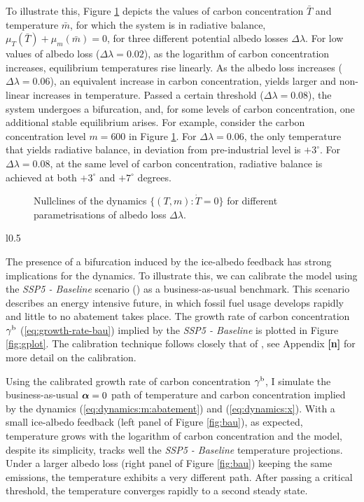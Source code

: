 \documentclass[../../main.tex]{subfiles}
\begin{document}
To illustrate this, Figure \ref{fig:nullclines} depicts the values of carbon concentration $\bar{T}$ and temperature $\bar m$, for which the system is in radiative balance, $\mu_T(\bar{T}) + \mu_m(\bar{m}) = 0$, for three different potential albedo losses $\Delta \lambda$. For low values of albedo loss ($\Delta \lambda = 0.02$), as the logarithm of carbon concentration increases, equilibrium temperatures rise linearly. As the albedo loss increases ($\Delta \lambda = 0.06$), an equivalent increase in carbon concentration, yields larger and non-linear increases in temperature. Passed a certain threshold ($\Delta \lambda = 0.08$), the system undergoes a bifurcation, and, for some levels of carbon concentration, one additional stable equilibrium arises. For example, consider the carbon concentration level $m = 600$ in Figure \ref{fig:nullclines}. For $\Delta \lambda = 0.06$, the only temperature that yields radiative balance, in deviation from pre-industrial level is $+3^\circ$. For $\Delta \lambda = 0.08$, at the same level of carbon concentration, radiative balance is achieved at both $+3^\circ$ and $+7^\circ$ degrees. 

\begin{figure}[H]
    \centering
    \caption{Nullclines of the dynamics $\{(T, m): \dot{T} = 0\}$ for different parametrisations of albedo loss $\Delta \lambda$.}
    \label{fig:nullclines}
\end{figure}

\begin{wrapfigure}{l}{0.5\textwidth}
    \caption{}
    \label{fig:gplot}
\end{wrapfigure}
The presence of a bifurcation induced by the ice-albedo feedback has strong implications for the dynamics. To illustrate this, we can calibrate the model using the \textit{SSP5 - Baseline} scenario (\cite{kriegler_fossil-fueled_2017}) as a business-as-usual benchmark. This scenario describes an energy intensive future, in which fossil fuel usage develops rapidly and little to no abatement takes place. The growth rate of carbon concentration $\gamma^{\mathrm{b}}$ (\ref{eq:growth-rate-bau}) implied by the \textit{SSP5 - Baseline} is plotted in Figure \ref{fig:gplot}. The calibration technique follows closely that of , see Appendix \textbf{[n]} for more detail on the calibration.

Using the calibrated growth rate of carbon concentration $\gamma^{\mathrm{b}}$, I simulate the business-as-usual $\bm{\alpha} = 0$ path of temperature and carbon concentration implied by the dynamics (\ref{eq:dynamics:m:abatement}) and (\ref{eq:dynamics:x}). With a small ice-albedo feedback (left panel of Figure \ref{fig:bau}), as expected, temperature grows with the logarithm of carbon concentration and the model, despite its simplicity, tracks well the \textit{SSP5 - Baseline} temperature projections. Under a larger albedo loss (right panel of Figure \ref{fig:bau}) keeping the same emissions, the temperature exhibits a very different path. After passing a critical threshold, the temperature converges rapidly to a second steady state.
\end{document}
